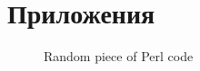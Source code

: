 \section{Приложения}

\begin{figure}
    
    \caption{Random piece of Perl code}
\end{figure} \label{src:collect}

\clearpage
